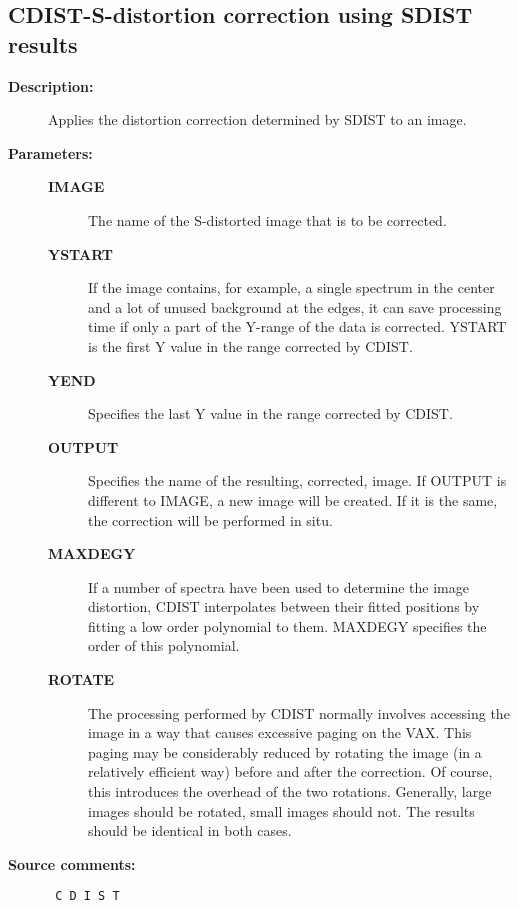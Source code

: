 \subsection{CDIST-\label{CDIST}S-distortion correction using SDIST results}
\begin{description}

\item [{\bf Description:}]
 Applies the distortion correction determined by SDIST to an image.

\item [{\bf Parameters:}]
\begin{description}
\item [{\bf IMAGE}]
 The name of the S-distorted image that is to be corrected.
\item [{\bf YSTART}]
 If the image contains, for example, a single spectrum
 in the center and a lot of unused background at the
 edges, it can save processing time if only a part of
 the Y-range of the data is corrected.  YSTART is the
 first Y value in the range corrected by CDIST.
\item [{\bf YEND}]
 Specifies the last Y value in the range corrected by CDIST.
\item [{\bf OUTPUT}]
 Specifies the name of the resulting, corrected, image.
 If OUTPUT is different to IMAGE, a new image will be created.
 If it is the same, the correction will be performed in situ.
\item [{\bf MAXDEGY}]
 If a number of spectra have been used to determine the
 image distortion, CDIST interpolates between their
 fitted positions by fitting a low order polynomial to
 them.  MAXDEGY specifies the order of this polynomial.
\item [{\bf ROTATE}]
 The processing performed by CDIST normally involves
 accessing the image in a way that causes excessive
 paging on the VAX.  This paging may be considerably
 reduced by rotating the image (in a relatively efficient
 way) before and after the correction.  Of course, this
 introduces the overhead of the two rotations.  Generally,
 large images should be rotated, small images should not.
 The results should be identical in both cases.
\end{description}

\item [{\bf Source comments:}]
\begin{verbatim}
 C D I S T


\end{verbatim}
\end{description}
